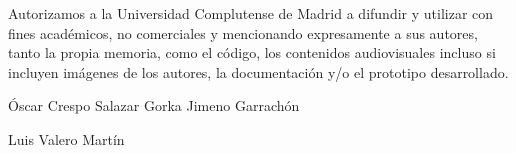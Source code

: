 \noindent Autorizamos a la Universidad Complutense de Madrid a difundir y utilizar con fines acad\'emicos, no comerciales y mencionando expresamente a sus autores, tanto la propia memoria, como el c\'odigo, los contenidos audiovisuales incluso si incluyen im\'agenes de los autores, la documentaci\'on y/o el prototipo desarrollado.\\

\vspace*{10cm}\par

\'Oscar Crespo Salazar \hspace*{5cm} Gorka Jimeno Garrach\'on

\vspace*{3cm}\par 

\hspace*{5cm}Luis Valero Mart\'in \hspace*{5cm}